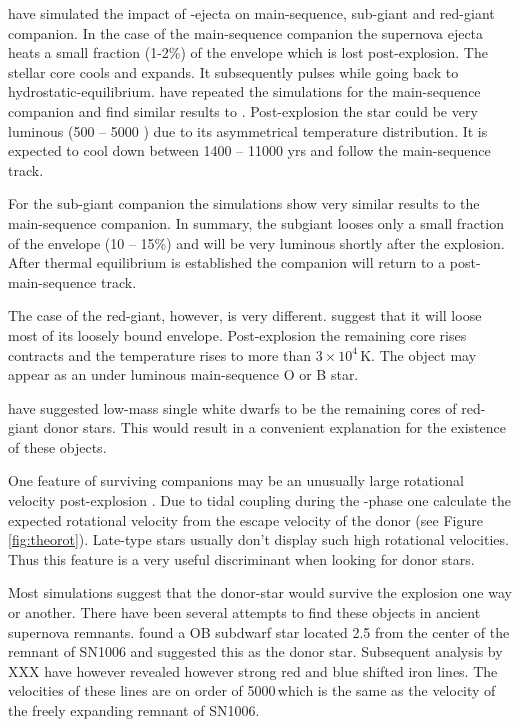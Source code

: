 \citet{2000ApJS..128..615M} have simulated the impact of \snia-ejecta on main-sequence, sub-giant and red-giant companion. In the case of the main-sequence companion the supernova ejecta heats a small fraction (1-2\%) of the envelope which is lost post-explosion. The stellar core cools and expands. It subsequently pulses while going back to hydrostatic-equilibrium. \citet{2008A&A...489..943P} have repeated the simulations for the main-sequence companion and find similar results to \citet{2000ApJS..128..615M}. Post-explosion the star could be very luminous (500 -- 5000 \lsun)  due to its asymmetrical temperature distribution. It is expected to cool down between 1400 -- 11000 yrs and follow the main-sequence track. 

For the sub-giant companion the simulations show very similar results to the main-sequence companion. In summary, the subgiant looses only a small fraction of the envelope (10 -- 15\%) and will be very luminous shortly after the explosion. After thermal equilibrium is established the companion will return to a post-main-sequence track. 

The case of the red-giant, however, is very different. \citet{2000ApJS..128..615M} suggest that it will loose most of its loosely bound envelope. Post-explosion the remaining core rises contracts and the temperature rises to more than $3 \times 10^4$\,K. The object may appear as an under luminous main-sequence O or B star. 


\cite{2009A&A...493.1081J} have suggested low-mass single white dwarfs to be the remaining cores of red-giant donor stars. This would result in a convenient explanation for the existence of these objects. 

One feature of surviving companions may be an unusually large rotational velocity post-explosion \citep[][chapter \ref{ch:sn1572_starg} of this work]{2009ApJ...701.1665K}. Due to tidal coupling during the \rlof-phase one calculate the expected rotational velocity from the escape velocity of the donor (see Figure \ref{fig:theorot}). Late-type stars usually don't display such high rotational velocities. Thus this feature is a very useful discriminant when looking for donor stars. 

 Most simulations suggest that the donor-star would survive the explosion one way or another. There have been several attempts to find these objects in ancient supernova remnants. \citet{1980ApJ...241.1039S} found a OB subdwarf star located 2.5 \arcmin from the center of the remnant of SN1006 and suggested this as the donor star. Subsequent analysis by XXX have however revealed however strong red and blue shifted iron lines. The velocities of these lines are on order of 5000\,\kms which is the same as the velocity of the freely expanding remnant of SN1006.
 
